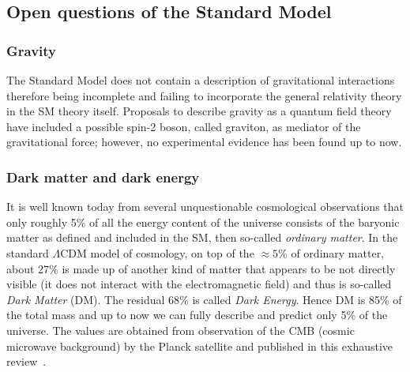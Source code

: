 \subsection{Open questions of the Standard Model}\label{sec:questions}
\subsubsection{Gravity}
The Standard Model does not contain a description of gravitational interactions therefore being incomplete and failing to incorporate the general relativity theory in the SM theory itself. Proposals to describe gravity as a quantum field theory have included a possible spin-2 boson, called graviton, as mediator of the gravitational force; however, no experimental evidence has been found up to now. 

\subsubsection{Dark matter and dark energy}

It is well known today from several unquestionable cosmological observations that only roughly 5$\%$ of all the energy content of the universe consists of the baryonic matter as defined and included in the SM, then so-called \emph{ordinary matter}. In the standard $\Lambda$CDM model of cosmology, on top of the $\approx 5\%$ of ordinary matter, about 27\% is made up of another kind of matter that appears to be not directly visible (it does not interact with the electromagnetic field) and thus is so-called \emph{Dark Matter} (DM). The residual 68\% is called \emph{Dark Energy}. Hence DM is 85\% of the total mass and up to now we can fully describe and predict only 5\% of the universe. The values are obtained from observation of the CMB (cosmic microwave background) by the Planck satellite and published in this exhaustive review~\cite{2020Plank}.

